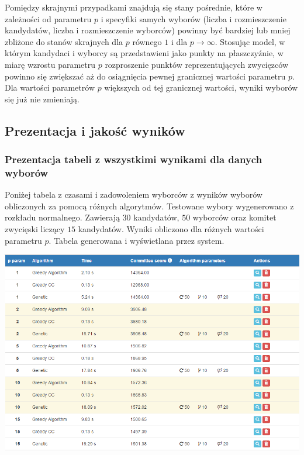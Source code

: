 \documentclass[polish,11pt]{aghthesis}
\begin{document}
Pomiędzy skrajnymi przypadkami znajdują się stany pośrednie, które w zależności od
parametru $p$ i specyfiki samych wyborów (liczba i rozmieszczenie kandydatów, liczba i
rozmieszczenie wyborców) powinny być bardziej lub mniej zbliżone do stanów skrajnych dla
$p$ równego $1$ i dla $p \to \infty$. Stosując model, w którym kandydaci i wyborcy są przedstawieni
jako punkty na płaszczyźnie, w miarę wzrostu parametru $p$ rozproszenie punktów
reprezentujących zwycięzców powinno się zwiększać aż do osiągnięcia pewnej granicznej
wartości parametru $p$. Dla wartości parametrów $p$ większych od tej granicznej wartości, wyniki
wyborów się już nie zmieniają.
\newpage

\subsection{Prezentacja i jakość wyników}
\subsubsection{Prezentacja tabeli z wszystkimi wynikami dla danych wyborów}
Poniżej tabela z czasami i zadowoleniem wyborców z wyników wyborów obliczonych za
pomocą różnych algorytmów. Testowane wybory wygenerowano z rozkładu normalnego.
Zawierają $30$ kandydatów, $50$ wyborców oraz komitet zwycięski liczący $15$ kandydatów.
Wyniki obliczono dla różnych wartości parametru $p$. Tabela generowana i wyświetlana przez system. \\

\begin{center}
\centerline{\includegraphics[scale=0.6]{pics/score_table.png}}
\end{center}
\end{document}
